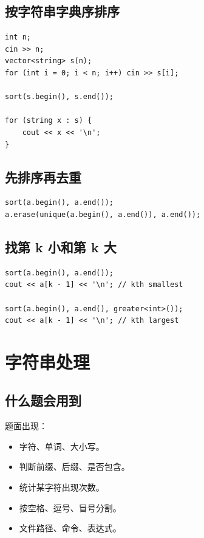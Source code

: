 \subsection{按字符串字典序排序}

\begin{lstlisting}
int n;
cin >> n;
vector<string> s(n);
for (int i = 0; i < n; i++) cin >> s[i];

sort(s.begin(), s.end());

for (string x : s) {
    cout << x << '\n';
}
\end{lstlisting}

\subsection{先排序再去重}

\begin{lstlisting}
sort(a.begin(), a.end());
a.erase(unique(a.begin(), a.end()), a.end());
\end{lstlisting}

\subsection{找第 k 小和第 k 大}

\begin{lstlisting}
sort(a.begin(), a.end());
cout << a[k - 1] << '\n'; // kth smallest

sort(a.begin(), a.end(), greater<int>());
cout << a[k - 1] << '\n'; // kth largest
\end{lstlisting}


\section{字符串处理}\label{sec:05-12}

\subsection{什么题会用到}

题面出现：

\begin{itemize}
  \item 字符、单词、大小写。
  \item 判断前缀、后缀、是否包含。
  \item 统计某字符出现次数。
  \item 按空格、逗号、冒号分割。
  \item 文件路径、命令、表达式。
\end{itemize}

